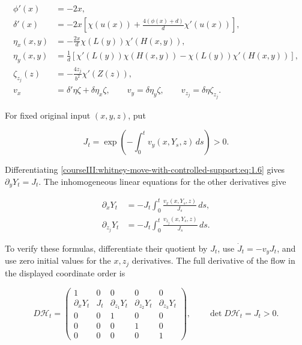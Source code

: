 \begin{equation}
\begin{aligned}
\phi'(x)&=-2x,\\
\delta'(x)&=-2x\left[
 \chi(u(x))+\frac{4(\phi(x)+d)}d\chi'(u(x))\right],\\
\eta_x(x,y)&=-\frac{2x}{d}\chi(L(y))\chi'(H(x,y)),\\
\eta_y(x,y)&=\frac1d\left[
 \chi'(L(y))\chi(H(x,y))-\chi(L(y))\chi'(H(x,y))\right],\\
\zeta_{z_j}(z)&=-\frac{4z_j}{b^2}\chi'(Z(z)),\\
v_x&=\delta'\eta\zeta+\delta\eta_x\zeta,\qquad
v_y=\delta\eta_y\zeta,\qquad
v_{z_j}=\delta\eta\zeta_{z_j}.
\end{aligned}
\label{courseIII:whitney-move-with-controlled-support:eq:2.1}
\end{equation}

For fixed original input \((x,y,z)\), put

\begin{equation}
J_t=\exp\left(-\int_0^t v_y(x,Y_s,z)\,ds\right)>0.
\label{courseIII:whitney-move-with-controlled-support:eq:2.2}
\end{equation}

Differentiating \eqref{courseIII:whitney-move-with-controlled-support:eq:1.6} gives \(\partial_yY_t=J_t\). The inhomogeneous linear equations for the other derivatives give

\begin{equation}
\begin{aligned}
\partial_xY_t&=-J_t\int_0^t
 \frac{v_x(x,Y_s,z)}{J_s}\,ds,\\
\partial_{z_j}Y_t&=-J_t\int_0^t
 \frac{v_{z_j}(x,Y_s,z)}{J_s}\,ds.
\end{aligned}
\label{courseIII:whitney-move-with-controlled-support:eq:2.3}
\end{equation}

To verify these formulas, differentiate their quotient by \(J_t\), use \(\dot J_t=-v_yJ_t\), and use zero initial values for the \(x,z_j\) derivatives. The full derivative of the flow in the displayed coordinate order is

\begin{equation}
D\mathcal H_t=
\begin{pmatrix}
1&0&0&0&0\\
\partial_xY_t&J_t&\partial_{z_1}Y_t&\partial_{z_2}Y_t&\partial_{z_3}Y_t\\
0&0&1&0&0\\
0&0&0&1&0\\
0&0&0&0&1
\end{pmatrix},
\qquad \det D\mathcal H_t=J_t>0.
\label{courseIII:whitney-move-with-controlled-support:eq:2.4}
\end{equation}

